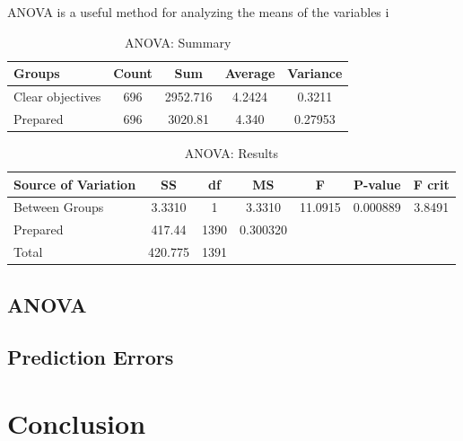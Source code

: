\documentclass[10pt]{report}
\begin{document}
ANOVA is a useful method for analyzing the means of the variables i

\begin{table}[!htbp]
    \centering

	\begin{tabular}{lcccc}
	\hline
    Groups & Count & Sum & Average & Variance \\
    \hline
    Clear objectives & 696 & 2952.716 & 4.2424 & 0.3211 \\
    Prepared & 696 & 3020.81 & 4.340 & 0.27953 \\
	\hline
	\end{tabular}

    \caption{ANOVA: Summary}
\end{table}

\begin{table}[!htbp]
    \centering

	\begin{tabular}{lcccccc}
	\hline
        Source of Variation & SS & df & MS & F & P-value & F crit \\
    \hline
    Between Groups & 3.3310 & 1 & 3.3310 & 11.0915 & 0.000889 & 3.8491 \\
    Prepared & 417.44 & 1390 & 0.300320  & & & \\
    Total & 420.775 & 1391 & & & & \\ 
	\hline
	\end{tabular}

    \caption{ANOVA: Results}
\end{table}

\subsection*{ANOVA}

\subsection*{Prediction Errors}







\newpage
\section*{Conclusion}
\end{document}
